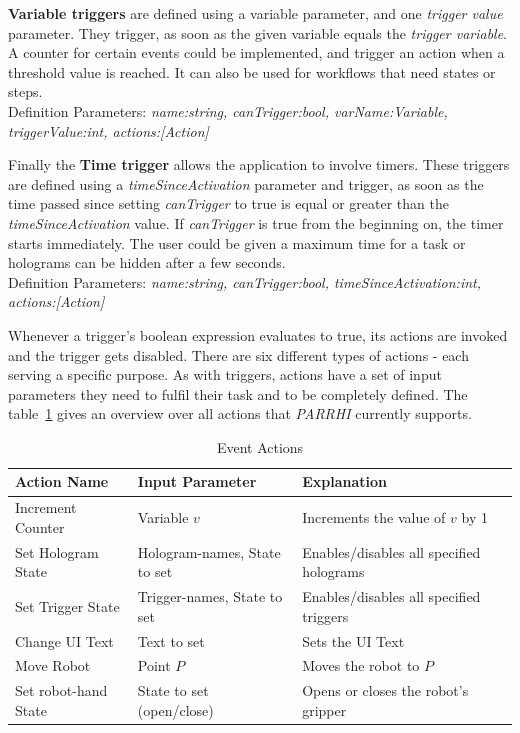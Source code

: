 \textbf{Variable triggers} are defined using a variable parameter, and one \textit{trigger value} parameter. They trigger, as soon as the given variable equals the \textit{trigger variable}. A counter for certain events could be implemented, and trigger an action when a threshold value is reached. It can also be used for workflows that need states or steps. \\Definition Parameters: \textit{name:string, canTrigger:bool, varName:Variable, triggerValue:int, actions:[Action]}

Finally the \textbf{Time trigger} allows the application to involve timers. These triggers are defined using a \textit{timeSinceActivation} parameter and trigger, as soon as the time passed since setting \textit{canTrigger} to true is equal or greater than the \textit{timeSinceActivation} value. If \textit{canTrigger} is true from the beginning on, the timer starts immediately. The user could be given a maximum time for a task or holograms can be hidden after a few seconds.\\Definition Parameters: \textit{name:string, canTrigger:bool, timeSinceActivation:int, actions:[Action]}

Whenever a trigger's boolean expression evaluates to true, its actions are invoked and the trigger gets disabled. There are six different types of actions - each serving a specific purpose. As with triggers, actions have a set of input parameters they need to fulfil their task and to be completely defined. The table~\ref{Table:Actions} gives an overview over all actions that \textit{PARRHI} currently supports.

\begin{table}
	\caption{Event Actions}
	\label{Table:Actions}
	\centering
	\begin{tabular}{lll}
		\toprule
		Action Name & Input Parameter		& Explanation	\\		
		\midrule
		Increment Counter  	& Variable $v$					& Increments the value of $v$ by 1 \\
		Set Hologram State 	& Hologram-names, State to set	& Enables/disables all specified holograms \\
		Set Trigger State  	& Trigger-names, State to set  	& Enables/disables all specified triggers \\
		Change UI Text	  	& Text to set					& Sets the UI Text\\
		Move Robot			& Point $P$						& Moves the robot to $P$ \\
		Set robot-hand State & State to set (open/close)		& Opens or closes the robot's gripper \\
		\bottomrule
	\end{tabular}
\end{table}

